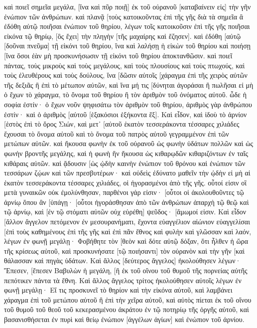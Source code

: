 καὶ ποιεῖ σημεῖα μεγάλα, [ἵνα καὶ πῦρ ποιῇ] ἐκ τοῦ οὐρανοῦ [καταβαίνειν εἰς] τὴν γῆν ἐνώπιον τῶν ἀνθρώπων. 
καὶ πλανᾷ [τοὺς κατοικοῦντας ἐπὶ τῆς γῆς διὰ τὰ σημεῖα ἃ ἐδόθη αὐτῷ ποιῆσαι ἐνώπιον τοῦ θηρίου, λέγων τοῖς κατοικοῦσιν ἐπὶ τῆς γῆς ποιῆσαι εἰκόνα τῷ θηρίῳ, [ὃς ἔχει] τὴν πληγὴν [τῆς μαχαίρης καὶ ἔζησεν]. 
καὶ ἐδόθη [αὐτῷ [δοῦναι πνεῦμα] τῇ εἰκόνι τοῦ θηρίου, ἵνα καὶ λαλήσῃ ἡ εἰκὼν τοῦ θηρίου καὶ ποιήσῃ [ἵνα ὅσοι ἐὰν μὴ προσκυνήσωσιν τῇ εἰκόνι τοῦ θηρίου ἀποκτανθῶσιν. 
καὶ ποιεῖ πάντας, τοὺς μικροὺς καὶ τοὺς μεγάλους, καὶ τοὺς πλουσίους καὶ τοὺς πτωχούς, καὶ τοὺς ἐλευθέρους καὶ τοὺς δούλους, ἵνα [δῶσιν αὐτοῖς [χάραγμα ἐπὶ τῆς χειρὸς αὐτῶν τῆς δεξιᾶς ἢ ἐπὶ τὸ μέτωπον αὐτῶν, 
καὶ ἵνα μή τις [δύνηται ἀγοράσαι ἢ πωλῆσαι εἰ μὴ ὁ ἔχων τὸ χάραγμα, τὸ ὄνομα τοῦ θηρίου ἢ τὸν ἀριθμὸν τοῦ ὀνόματος αὐτοῦ. 
ὧδε ἡ σοφία ἐστίν· ὁ ἔχων νοῦν ψηφισάτω τὸν ἀριθμὸν τοῦ θηρίου, ἀριθμὸς γὰρ ἀνθρώπου ἐστίν· καὶ ὁ ἀριθμὸς [αὐτοῦ [ἑξακόσιοι ἑξήκοντα ἕξ]. 
Καὶ εἶδον, καὶ ἰδοὺ τὸ ἀρνίον [ἑστὸς ἐπὶ τὸ ὄρος Σιών, καὶ μετ᾽ [αὐτοῦ ἑκατὸν τεσσεράκοντα τέσσαρες χιλιάδες ἔχουσαι τὸ ὄνομα αὐτοῦ καὶ τὸ ὄνομα τοῦ πατρὸς αὐτοῦ γεγραμμένον ἐπὶ τῶν μετώπων αὐτῶν. 
καὶ ἤκουσα φωνὴν ἐκ τοῦ οὐρανοῦ ὡς φωνὴν ὑδάτων πολλῶν καὶ ὡς φωνὴν βροντῆς μεγάλης, καὶ ἡ φωνὴ ἣν ἤκουσα ὡς κιθαρῳδῶν κιθαριζόντων ἐν ταῖς κιθάραις αὐτῶν. 
καὶ ᾄδουσιν [ὡς ᾠδὴν καινὴν ἐνώπιον τοῦ θρόνου καὶ ἐνώπιον τῶν τεσσάρων ζῴων καὶ τῶν πρεσβυτέρων· καὶ οὐδεὶς ἐδύνατο μαθεῖν τὴν ᾠδὴν εἰ μὴ αἱ ἑκατὸν τεσσεράκοντα τέσσαρες χιλιάδες, οἱ ἠγορασμένοι ἀπὸ τῆς γῆς. 
οὗτοί εἰσιν οἳ μετὰ γυναικῶν οὐκ ἐμολύνθησαν, παρθένοι γάρ εἰσιν· [οὗτοι οἱ ἀκολουθοῦντες τῷ ἀρνίῳ ὅπου ἂν [ὑπάγῃ· [οὗτοι ἠγοράσθησαν ἀπὸ τῶν ἀνθρώπων ἀπαρχὴ τῷ θεῷ καὶ τῷ ἀρνίῳ, 
καὶ [ἐν τῷ στόματι αὐτῶν οὐχ εὑρέθη] ψεῦδος· [ἄμωμοί εἰσιν. 
Καὶ εἶδον [ἄλλον ἄγγελον πετόμενον ἐν μεσουρανήματι, ἔχοντα εὐαγγέλιον αἰώνιον εὐαγγελίσαι [ἐπὶ τοὺς καθημένους ἐπὶ τῆς γῆς καὶ ἐπὶ πᾶν ἔθνος καὶ φυλὴν καὶ γλῶσσαν καὶ λαόν, 
λέγων ἐν φωνῇ μεγάλῃ· Φοβήθητε τὸν [θεὸν καὶ δότε αὐτῷ δόξαν, ὅτι ἦλθεν ἡ ὥρα τῆς κρίσεως αὐτοῦ, καὶ προσκυνήσατε [τῷ ποιήσαντι] τὸν οὐρανὸν καὶ τὴν γῆν [καὶ θάλασσαν καὶ πηγὰς ὑδάτων. 
Καὶ ἄλλος [δεύτερος ἄγγελος] ἠκολούθησεν λέγων· Ἔπεσεν, [ἔπεσεν Βαβυλὼν ἡ μεγάλη, [ἣ ἐκ τοῦ οἴνου τοῦ θυμοῦ τῆς πορνείας αὐτῆς πεπότικεν πάντα τὰ ἔθνη. 
Καὶ ἄλλος ἄγγελος τρίτος ἠκολούθησεν αὐτοῖς λέγων ἐν φωνῇ μεγάλῃ· Εἴ τις προσκυνεῖ τὸ θηρίον καὶ τὴν εἰκόνα αὐτοῦ, καὶ λαμβάνει χάραγμα ἐπὶ τοῦ μετώπου αὐτοῦ ἢ ἐπὶ τὴν χεῖρα αὐτοῦ, 
καὶ αὐτὸς πίεται ἐκ τοῦ οἴνου τοῦ θυμοῦ τοῦ θεοῦ τοῦ κεκερασμένου ἀκράτου ἐν τῷ ποτηρίῳ τῆς ὀργῆς αὐτοῦ, καὶ βασανισθήσεται ἐν πυρὶ καὶ θείῳ ἐνώπιον [ἀγγέλων ἁγίων] καὶ ἐνώπιον τοῦ ἀρνίου. 
